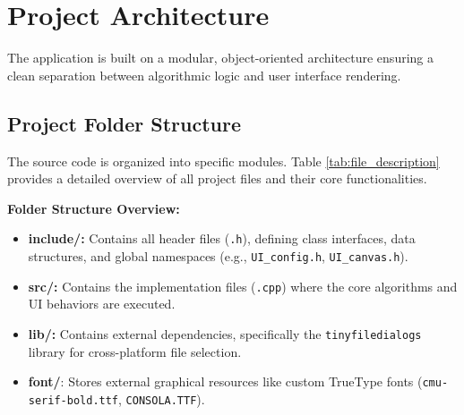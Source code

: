 \section{Project Architecture}
The application is built on a modular, object-oriented architecture ensuring a clean separation between algorithmic logic and user interface rendering.

\subsection{Project Folder Structure}

The source code is organized into specific modules. Table \ref{tab:file_description} provides a detailed overview of all project files and their core functionalities.

\textbf{Folder Structure Overview:}

\begin{itemize}
    \item \textbf{include/:} Contains all header files (\texttt{.h}), defining class interfaces, data structures, and global namespaces (e.g., \texttt{UI\_config.h}, \texttt{UI\_canvas.h}).
    \item \textbf{src/:} Contains the implementation files (\texttt{.cpp}) where the core algorithms and UI behaviors are executed.
    \item \textbf{lib/:} Contains external dependencies, specifically the \texttt{tinyfiledialogs} library for cross-platform file selection.
    \item \textbf{font/}: Stores external graphical resources like custom TrueType fonts (\texttt{cmu-serif-bold.ttf}, \texttt{CONSOLA\allowbreak.TTF}).
\end{itemize}

